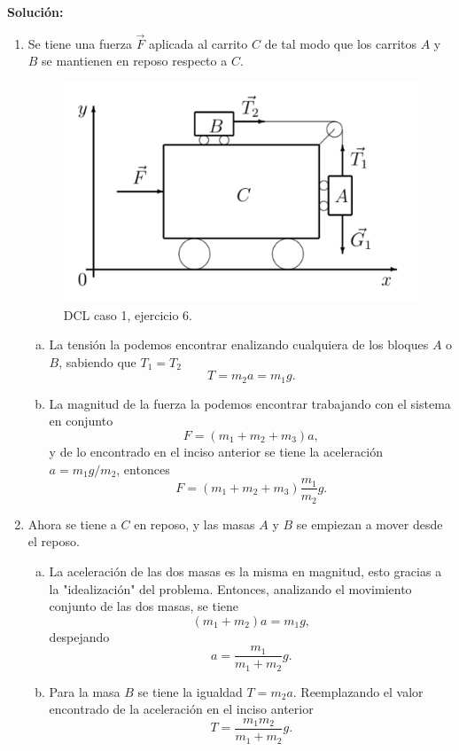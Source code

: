 \begin{mdframed}[style=warning]
	\noindent \textbf{Solución: } \\
	\begin{enumerate}[1)]
		\item Se tiene una fuerza $\vec{F}$ aplicada al carrito $C$ de tal modo que los carritos $A$ y $B$ se mantienen en reposo respecto a $C$.
		\begin{figure}[H]
			\centering
			\includegraphics[scale=0.5]{./img/ej6_dcl1.png}
			\caption{DCL caso 1, ejercicio 6.}
			\label{dcl_ej6_1}
		\end{figure}
		
		\begin{enumerate}[a)]
			\item La tensión la podemos encontrar enalizando cualquiera de los bloques $A$ o $B$, sabiendo que $T_1 = T_2$
			$$ \boxed{ T = m_2 a = m_1 g. } $$
			\item La magnitud de la fuerza la podemos encontrar trabajando con el sistema en conjunto
				$$ F = (m_1 + m_2 + m_3) a, $$
			y de lo encontrado en el inciso anterior se tiene la aceleración $a = m_1 g/m_2$, entonces
				$$ \boxed{ F = (m_1 + m_2 + m_3) \frac{m_1}{m_2} g. } $$
		\end{enumerate}		
		
		\item Ahora se tiene a $C$ en reposo, y las masas $A$ y $B$ se empiezan a mover desde el reposo. 
		\begin{enumerate}[a)]
			\item La aceleración de las dos masas es la misma en magnitud, esto gracias a la "idealización" del problema. Entonces, analizando el movimiento conjunto de las dos masas, se tiene
			$$ (m_1 + m_2) a = m_1 g, $$
		despejando
			$$ \boxed{ a = \frac{m_1}{m_1 + m_2} g. } $$
			\item Para la masa $B$ se tiene la igualdad $T = m_2 a$. Reemplazando el valor encontrado de la aceleración en el inciso anterior
			$$ \boxed{ T = \frac{m_1 m_2}{m_1 + m_2} g. } $$
		\end{enumerate}	
	\end{enumerate}
\end{mdframed}





